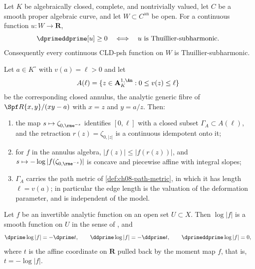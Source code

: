 \begin{theorem}\label{thm:wanner-curve-comparison}
Let \(K\) be algebraically closed, complete, and nontrivially valued, let
\(C\) be a smooth proper algebraic curve, and let \(W\subset C^{\mathrm{an}}\)
be open.  For a continuous function \(u:W\to\mathbf R\),
\[
                  \dprimeddprime[u]\geq0
        \quad\Longleftrightarrow\quad
                  u\text{ is Thuillier-subharmonic}.
\]
Consequently every continuous CLD-psh function on \(W\) is
Thuillier-subharmonic.
\end{theorem}

\begin{proposition}
\label{prop:ch08-annulus-skeleton}
Let $a\in K^\circ$ with $v(a)=\ell>0$ and let
\[
 A(\ell)=\{z\in\mathbf A^{1,\An}_K:0\leq v(z)\leq\ell\}
\]
be the corresponding closed annulus, the analytic generic fibre of
$\Spf R\{x,y\}/(xy-a)$ with $x=z$ and $y=a/z$.  Then:
\begin{enumerate}
\item the map $s\mapsto\zeta_{0,\rme^{-s}}$ identifies $[0,\ell]$ with a
closed subset $\Gamma_{A}\subset A(\ell)$, and the retraction
$r(z)=\zeta_{0,|z|}$ is a continuous idempotent onto it;
\item for $f$ in the annulus algebra, $|f(z)|\leq|f(r(z))|$, and
$s\mapsto-\log|f(\zeta_{0,\rme^{-s}})|$ is concave and piecewise affine with
integral slopes;
\item $\Gamma_A$ carries the path metric of \cref{def:ch08-path-metric}, in
which it has length $\ell=v(a)$; in particular the edge length is the
valuation of the deformation parameter, and is independent of the model.
\end{enumerate}
\end{proposition}

\begin{lemma}
\label{lem:ch15-log-smooth}
Let $f$ be an invertible analytic function on an open set $U\subset X$.  Then
$\log|f|$ is a smooth function on $U$ in the sense of
, and
\[
 \dprime\log|f|=-\dprime t,\qquad
 \ddprime\log|f|=-\ddprime t,\qquad
 \dprimeddprime\log|f|=0 ,
\]
where $t$ is the affine coordinate on $\mathbf R$ pulled back by the moment
map $f$, that is, $t=-\log|f|$.
\end{lemma}

